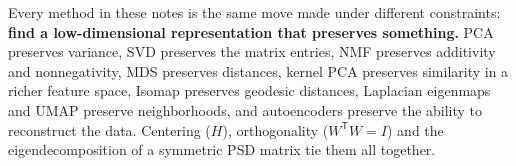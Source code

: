 \documentclass[11pt]{article}
\newcommand{\T}{^{\mathsf T}}
\begin{document}
\begin{intuition}
Every method in these notes is the same move made under different constraints:
\textbf{find a low-dimensional representation that preserves something.} PCA preserves
variance, SVD preserves the matrix entries, NMF preserves additivity and nonnegativity,
MDS preserves distances, kernel PCA preserves similarity in a richer feature space,
Isomap preserves geodesic distances, Laplacian eigenmaps and UMAP preserve neighborhoods, and autoencoders preserve
the ability to reconstruct the data.
Centering ($H$), orthogonality ($W\T W=I$) and the eigendecomposition of a symmetric PSD
matrix tie them all together.
\end{intuition}
\end{document}
